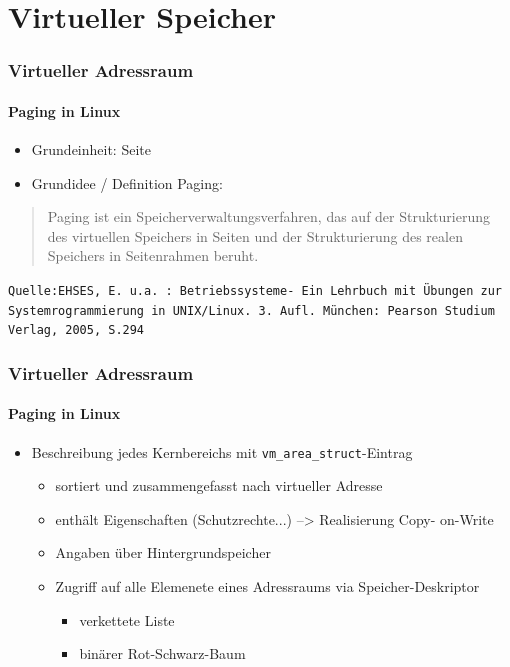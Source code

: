 \documentclass[ddcfooter,nosectionnum]{tudbeamer}
\begin{document}
\section{Virtueller Speicher}
\begin{frame}
    \frametitle{Virtueller Adressraum}
    \framesubtitle {Paging in Linux}
    \begin{itemize}
         \item  Grundeinheit: Seite
         \item Grundidee / Definition Paging: 
          \end{itemize}
        \begin{quote}
          	\glqq Paging ist ein Speicherverwaltungsverfahren, das auf der Strukturierung  des virtuellen Speichers 	in Seiten und der Strukturierung des realen Speichers in Seitenrahmen beruht.\grqq
         \end{quote}
         \texttt{\tiny Quelle:EHSES, E. u.a. : Betriebssysteme- Ein Lehrbuch mit Übungen zur Systemrogrammierung in UNIX/Linux. 3. Aufl. München: Pearson Studium Verlag, 2005, S.294}
	    
\end{frame}


\begin{frame}
    \frametitle{Virtueller Adressraum}
    \framesubtitle {Paging in Linux}
    \begin{itemize}
    	    \item Beschreibung jedes Kernbereichs mit \texttt{vm\_area\_struct}-Eintrag 
   		\begin{itemize}
			 \item sortiert und zusammengefasst nach virtueller Adresse\\
			\item enthält Eigenschaften (Schutzrechte...)
			--> Realisierung Copy- on-Write
			\item Angaben über Hintergrundspeicher
    			\item Zugriff auf alle Elemenete eines Adressraums via Speicher-Deskriptor
			\begin{itemize}
				\item verkettete Liste
				\item binärer Rot-Schwarz-Baum
			\end{itemize}
   		\end{itemize} 
	\end{itemize}
    
\end{frame}
\end{document}
